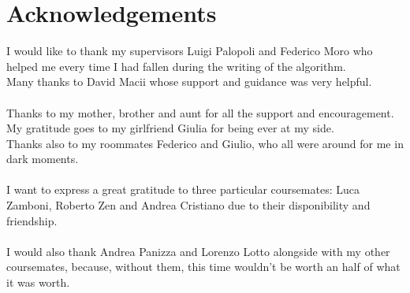 \chapter*{Acknowledgements}
\thispagestyle{empty}

I would like to thank my supervisors Luigi Palopoli and Federico Moro who helped me every time I had fallen during the writing of the algorithm.
\\
Many thanks to David Macii whose support and guidance was very helpful.
\\ \\
Thanks to my mother, brother and aunt for all the support and encouragement.
\\
My gratitude goes to my girlfriend Giulia for being ever at my side.
\\
Thanks also to my roommates Federico and Giulio, who all were around for me in dark moments.
\\ \\ 
I want to express a great gratitude to three particular coursemates: Luca Zamboni, Roberto Zen and Andrea Cristiano due to their disponibility and friendship.
\\ \\
I would also thank Andrea Panizza and Lorenzo Lotto alongside with my other coursemates, because, without them, this time wouldn't be worth an half of what it was worth.

